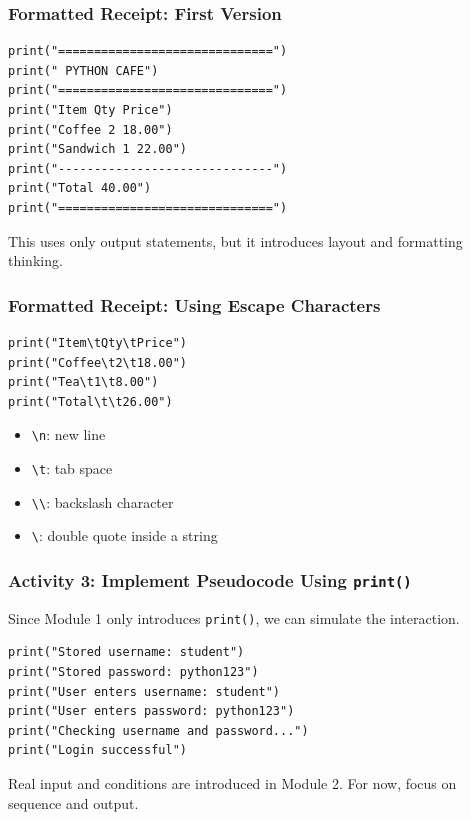\documentclass[aspectratio=169,10pt]{beamer}
\begin{document}
\begin{frame}[fragile]
\frametitle{Formatted Receipt: First Version}
\vspace{1.05cm}
\begin{lstlisting}[style=pycodemedium]
print("==============================")
print(" PYTHON CAFE")
print("==============================")
print("Item Qty Price")
print("Coffee 2 18.00")
print("Sandwich 1 22.00")
print("------------------------------")
print("Total 40.00")
print("==============================")
\end{lstlisting}
\vspace{0.20cm}
This uses only output statements, but it introduces layout and formatting thinking.
\end{frame}


\begin{frame}[fragile]
\frametitle{Formatted Receipt: Using Escape Characters}
\vspace{0.82cm}
\begin{lstlisting}[style=pycodelarge]
print("Item\tQty\tPrice")
print("Coffee\t2\t18.00")
print("Tea\t1\t8.00")
print("Total\t\t26.00")
\end{lstlisting}
\vspace{0.34cm}
\begin{tcolorbox}[lecturebox,title=Useful escape characters]
\begin{itemize}
  \item \texttt{\textbackslash n}: new line
  \item \texttt{\textbackslash t}: tab space
  \item \texttt{\textbackslash\textbackslash}: backslash character
  \item \texttt{\textbackslash\textquotedbl}: double quote inside a string
\end{itemize}
\end{tcolorbox}
\end{frame}


\begin{frame}[fragile]
\frametitle{Activity 3: Implement Pseudocode Using \texttt{print()}}
\vspace{0.54cm}
Since Module 1 only introduces \texttt{print()}, we can simulate the interaction.
\vspace{0.12cm}
\begin{lstlisting}[style=pycodelarge]
print("Stored username: student")
print("Stored password: python123")
print("User enters username: student")
print("User enters password: python123")
print("Checking username and password...")
print("Login successful")
\end{lstlisting}
\vspace{0.25cm}
\begin{tcolorbox}[lecturebox,title=Why simulate?]
Real input and conditions are introduced in Module 2. For now, focus on sequence and output.
\end{tcolorbox}
\end{frame}
\end{document}

